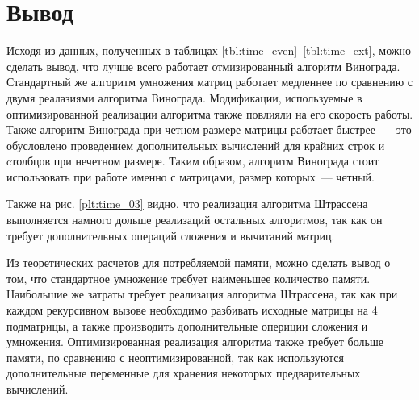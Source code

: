 \section*{Вывод}
Исходя из данных, полученных в таблицах \ref{tbl:time_even}--\ref{tbl:time_ext}, можно сделать вывод, что лучше всего работает отмизированный алгоритм Винограда.
Стандартный же алгоритм умножения матриц работает медленнее по сравнению с двумя реалазиями алгоритма Винограда.
Модификации, используемые в оптимизированной реализации алгоритма также повлияли на его скорость работы. 
Также алгоритм Винограда при четном размере матрицы работает быстрее~--- это обусловлено проведением дополнительных вычислений для крайних строк и cтолбцов при нечетном размере. 
Таким образом, алгоритм Винограда стоит использовать при работе именно с матрицами, размер которых~--- четный.

Также на рис. \ref{plt:time_03} видно, что реализация алгоритма Штрассена выполняется намного дольше реализаций остальных алгоритмов, так как он требует дополнительных операций сложения и вычитаний матриц.

Из теоретических расчетов для потребляемой памяти, можно сделать вывод о том, что стандартное умножение требует наименьшее количество памяти. 
Наибольшие же затраты требует реализация алгоритма Штрассена, так как при каждом рекурсивном вызове необходимо разбивать исходные матрицы на 4 подматрицы, а также производить дополнительные опериции сложения и умножения.
Оптимизированная реализация алгоритма также требует больше памяти, по сравнению с неоптимизированной, так как используются дополнительные переменные для хранения некоторых предварительных вычислений.